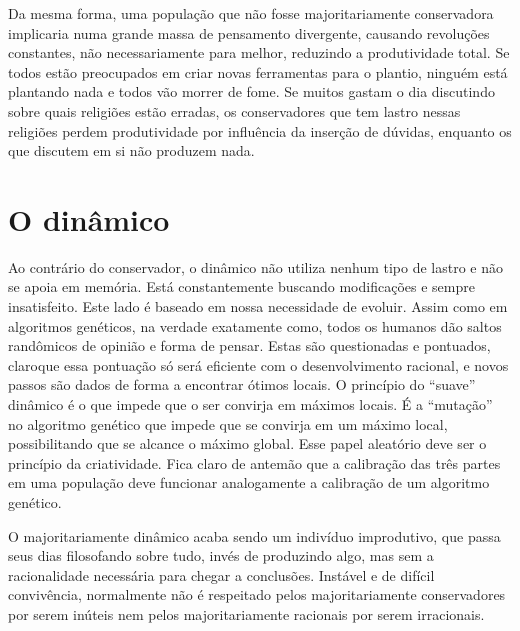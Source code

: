 \documentclass[14pt,portuguese]{extreport}
\begin{document}
	Da mesma forma, uma população que não fosse majoritariamente
	conservadora implicaria numa grande massa de pensamento
	divergente, causando revoluções constantes, não necessariamente para
	melhor, reduzindo a produtividade total. Se todos estão preocupados
	em criar novas ferramentas para o plantio, ninguém está plantando
	nada e todos vão morrer de fome. Se muitos gastam o dia discutindo
	sobre quais religiões estão erradas, os conservadores que tem lastro
	nessas religiões perdem produtividade por influência da inserção de
	dúvidas, enquanto os que discutem em si não produzem nada.
	
    \section{O dinâmico}
      
      Ao contrário do conservador, o dinâmico não utiliza nenhum tipo de
      lastro e não se apoia em memória. Está constantemente buscando
      modificações e sempre insatisfeito. Este lado é baseado em nossa
      necessidade de evoluir. Assim como em algoritmos genéticos, na
      verdade exatamente como, todos os humanos dão saltos randômicos de
      opinião e forma de pensar. Estas são questionadas e pontuados, claroque essa pontuação só será eficiente com o desenvolvimento racional,
      e novos passos são dados de forma a encontrar ótimos locais. O princípio
      do “suave” dinâmico é o que impede que o ser convirja em máximos
      locais. É a “mutação” no algoritmo genético que impede que se convirja
      em um máximo local, possibilitando que se alcance o máximo global.
      Esse papel aleatório deve ser o princípio da criatividade. Fica claro de
      antemão que a calibração das três partes em uma população deve
      funcionar analogamente a calibração de um algoritmo genético.
      
      O majoritariamente dinâmico acaba sendo um indivíduo
      improdutivo, que passa seus dias filosofando sobre tudo, invés de
      produzindo algo, mas sem a racionalidade necessária para chegar a
      conclusões. Instável e de difícil convivência, normalmente não é
      respeitado pelos majoritariamente conservadores por serem inúteis
      nem pelos majoritariamente racionais por serem irracionais.
      
\end{document}
